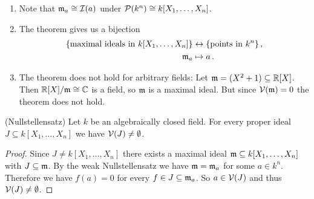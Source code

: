 \begin{rem}
  \begin{enumerate}[label=\emph{\alph*)},leftmargin=*]
    \item
      Note that $\mathfrak{m}_{a} \cong \mathcal{I}(a)$ under $\mathcal{P}(k^n) \cong k[X_1, \dotsc, X_n]$.
    \item
      The theorem gives us a bijection
      \begin{align*}
                          \{\text{maximal ideals in $k[X_1, \dotsc, X_n]$}\}
        &\leftrightarrow  \{\text{points in $k^n$}\} \,,  \\
                          \mathfrak{m}_a
        &\mapsto          a \,.
      \end{align*}
    \item
      The theorem does not hold for arbitrary fields:
      Let \mbox{$\mathfrak{m} = (X^2 + 1) \subseteq \mathbb{R}[X]$}.
      Then $\mathbb{R}[X]/\mathfrak{m} \cong \mathbb{C}$ is a field, so $\mathfrak{m}$ is a maximal ideal.
      But since $\mathcal{V}(\mathfrak{m}) = 0$ the theorem does not hold.
  \end{enumerate}
\end{rem}


\begin{corollary}(Nullstellensatz)
  Let $k$ be an algebraically closed field.
  For every proper ideal $J \subseteq k[X_1, \dotsc, X_n]$ we have $\mathcal{V}(J) \neq \emptyset$.
\end{corollary}
\begin{proof}
  Since $J \neq k[X_1, \dotsc, X_n]$ there exists a maximal ideal $\mathfrak{m} \subseteq k[X_1, \dotsc, X_n]$ with $J \subseteq \mathfrak{m}$.
  By the weak Nullstellensatz we have $\mathfrak{m} = \mathfrak{m}_a$ for some $a \in k^n$.
  Therefore we have $f(a) = 0$ for every $f \in J \subseteq \mathfrak{m}_a$.
  So $a \in \mathcal{V}(J)$ and thus $\mathcal{V}(J) \neq \emptyset$.
\end{proof}


